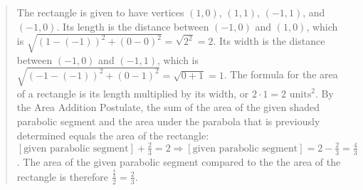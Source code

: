 \documentclass[letterpaper,12pt,twoside]{report}
\begin{document}
\begin{quotation}
		The rectangle is given to have vertices $(1,0)$, $(1,1)$, $(-1,1)$, and $(-1, 0)$. Its length is the distance between $(-1,0)$ and $(1,0)$, which is $\sqrt{(1-(-1))^2+(0-0)^2}=\sqrt{2^2}=2$. Its width is the distance between $(-1,0)$ and $(-1,1)$, which is $\sqrt{(-1-(-1))^2+(0-1)^2}=\sqrt{0+1}=1$. The formula for the area of a rectangle is its length multiplied by its width, or $2\cdot 1=2 \text{  units}^2$. By the Area Addition Postulate, the sum of the area of the given shaded parabolic segment and the area under the parabola that is previously determined equals the area of the rectangle: $[\text{given parabolic segment}]+\frac{2}{3}=2 \Rightarrow [\text{given parabolic segment}]=2-\frac{2}{3}=\frac{4}{3}$. The area of the given parabolic segment compared to the the area of the rectangle is therefore $\frac{\frac{4}{3}}{2}=\boxed{\frac{2}{3}}$.
	\end{quotation}
\end{document}
